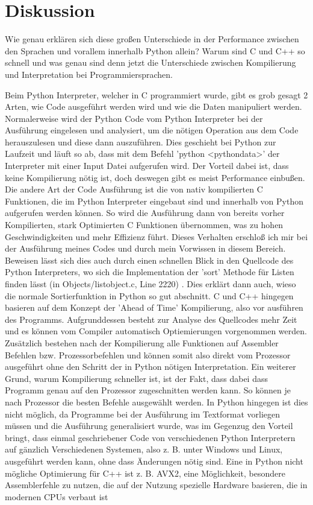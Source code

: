\documentclass[12pt,a4paper]{article}
\begin{document}
\clearpage
\section{Diskussion}

Wie genau erklären sich diese großen Unterschiede in der Performance zwischen den Sprachen und vorallem innerhalb Python allein?
Warum sind C und C++ so schnell und was genau sind denn jetzt die Unterschiede zwischen Kompilierung und Interpretation bei Programmiersprachen.

Beim Python Interpreter, welcher in C programmiert wurde, gibt es grob gesagt 2 Arten, wie Code ausgeführt werden wird und
wie die Daten manipuliert werden. Normalerweise wird der Python Code vom Python Interpreter bei der Ausführung eingelesen und analysiert,
um die nötigen Operation aus dem Code herauszulesen und diese dann auszuführen. Dies geschieht bei Python zur Laufzeit und läuft so ab,
dass mit dem Befehl 'python <pythondata>' der Interpreter mit einer Input Datei aufgerufen wird. Der Vorteil dabei ist, dass keine Kompilierung nötig ist,
doch deswegen gibt es meist Performance einbußen. Die andere Art der Code Ausführung ist die von nativ kompilierten C Funktionen,
die im Python Interpreter eingebaut sind und innerhalb von Python aufgerufen werden können. So wird die Ausführung dann von
bereits vorher Kompilierten, stark Optimierten C Funktionen übernommen, was zu hohen Geschwindigkeiten und mehr Effizienz führt.
Dieses Verhalten erschloß ich mir bei der Ausführung meines Codes und durch mein Vorwissen in diesem Bereich. Beweisen lässt sich
dies auch durch einen schnellen Blick in den Quellcode des Python Interpreters, wo sich die Implementation der 'sort' Methode für Listen
finden lässt (in Objects/listobject.c, Line 2220) \cite{pythonsource}. Dies erklärt dann auch, wieso die normale Sortierfunktion in Python so gut abschnitt.
C und C++ hingegen basieren auf dem Konzept der 'Ahead of Time' Kompilierung, also vor ausführen des Programms.
Aufgrunddessen besteht zur Analyse des Quellcodes mehr Zeit und es können vom Compiler automatisch Optiemierungen vorgenommen werden.
Zusätzlich bestehen nach der Kompilierung alle Funktionen auf Assembler Befehlen bzw. Prozessorbefehlen und können somit 
also direkt vom Prozessor ausgeführt ohne den Schritt der in Python nötigen Interpretation.
Ein weiterer Grund, warum Kompilierung schneller ist, ist der Fakt, dass dabei dass Programm genau auf den Prozessor zugeschnitten
werden kann. So können je nach Prozessor die besten Befehle ausgewählt werden. In Python hingegen ist dies nicht möglich,
da Programme bei der Ausführung im Textformat vorliegen müssen und die Ausführung generalisiert wurde, was im Gegenzug den Vorteil bringt,
dass einmal geschriebener Code von verschiedenen Python Interpretern auf gänzlich Verschiedenen Systemen, also z. B. unter Windows und Linux,
ausgeführt werden kann, ohne dass Änderungen nötig sind.
Eine in Python nicht mögliche Optimierung für C++ ist z. B. AVX2, eine Möglichkeit, besondere Assemblerfehle
zu nutzen, die auf der Nutzung spezielle Hardware basieren, die in modernen CPUs verbaut ist 
\end{document}
